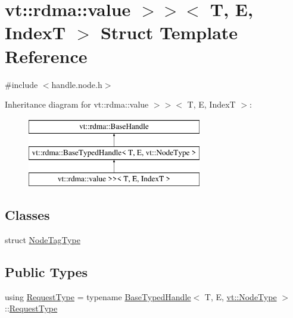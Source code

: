 \hypertarget{structvt_1_1rdma_1_1_handle_3_01_t_00_01_e_00_01_index_t_00_01typename_01std_1_1enable__if__t_3_d15dac1b5db6e2bc0fb0b8aca42b1456}{}\section{vt\+:\+:rdma\+:\+:value $>$$>$$<$ T, E, IndexT $>$ Struct Template Reference}
\label{structvt_1_1rdma_1_1_handle_3_01_t_00_01_e_00_01_index_t_00_01typename_01std_1_1enable__if__t_3_d15dac1b5db6e2bc0fb0b8aca42b1456}


{\ttfamily \#include $<$handle.\+node.\+h$>$}

Inheritance diagram for vt\+:\+:rdma\+:\+:value $>$$>$$<$ T, E, IndexT $>$\+:\begin{figure}[H]
\begin{center}
\leavevmode
\includegraphics[height=3.000000cm]{structvt_1_1rdma_1_1_handle_3_01_t_00_01_e_00_01_index_t_00_01typename_01std_1_1enable__if__t_3_d15dac1b5db6e2bc0fb0b8aca42b1456}
\end{center}
\end{figure}
\subsection*{Classes}
\begin{DoxyCompactItemize}
\item 
struct \hyperlink{structvt_1_1rdma_1_1_handle_3_01_t_00_01_e_00_01_index_t_00_01typename_01std_1_1enable__if__t_3_bffc9b31b7d701a9d14f97993404e892}{Node\+Tag\+Type}
\end{DoxyCompactItemize}
\subsection*{Public Types}
\begin{DoxyCompactItemize}
\item 
using \hyperlink{structvt_1_1rdma_1_1_handle_3_01_t_00_01_e_00_01_index_t_00_01typename_01std_1_1enable__if__t_3_d15dac1b5db6e2bc0fb0b8aca42b1456_a94cb0db8d9b038fb504cb01b1d1d37a9}{Request\+Type} = typename \hyperlink{structvt_1_1rdma_1_1_base_typed_handle}{Base\+Typed\+Handle}$<$ T, E, \hyperlink{namespacevt_a866da9d0efc19c0a1ce79e9e492f47e2}{vt\+::\+Node\+Type} $>$\+::\hyperlink{structvt_1_1rdma_1_1_handle_3_01_t_00_01_e_00_01_index_t_00_01typename_01std_1_1enable__if__t_3_d15dac1b5db6e2bc0fb0b8aca42b1456_a94cb0db8d9b038fb504cb01b1d1d37a9}{Request\+Type}
\end{DoxyCompactItemize}
